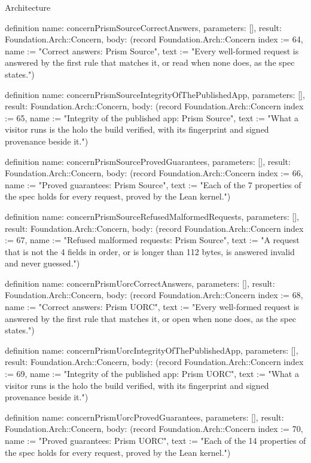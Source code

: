 \begin{lexlean}{Architecture}
\begin{semanticmodule}
definition{
  name: concernPrismSourceCorrectAnswers,
  parameters: [],
  result: Foundation.Arch::Concern,
  body: (record Foundation.Arch::Concern {index := 64, name := "Correct answers: Prism Source", text := "Every well-formed request is answered by the first rule that matches it, or read when none does, as the spec states."})
}

definition{
  name: concernPrismSourceIntegrityOfThePublishedApp,
  parameters: [],
  result: Foundation.Arch::Concern,
  body: (record Foundation.Arch::Concern {index := 65, name := "Integrity of the published app: Prism Source", text := "What a visitor runs is the holo the build verified, with its fingerprint and signed provenance beside it."})
}

definition{
  name: concernPrismSourceProvedGuarantees,
  parameters: [],
  result: Foundation.Arch::Concern,
  body: (record Foundation.Arch::Concern {index := 66, name := "Proved guarantees: Prism Source", text := "Each of the 7 properties of the spec holds for every request, proved by the Lean kernel."})
}

definition{
  name: concernPrismSourceRefusedMalformedRequests,
  parameters: [],
  result: Foundation.Arch::Concern,
  body: (record Foundation.Arch::Concern {index := 67, name := "Refused malformed requests: Prism Source", text := "A request that is not the 4 fields in order, or is longer than 112 bytes, is answered invalid and never guessed."})
}

definition{
  name: concernPrismUorcCorrectAnswers,
  parameters: [],
  result: Foundation.Arch::Concern,
  body: (record Foundation.Arch::Concern {index := 68, name := "Correct answers: Prism UORC", text := "Every well-formed request is answered by the first rule that matches it, or open when none does, as the spec states."})
}

definition{
  name: concernPrismUorcIntegrityOfThePublishedApp,
  parameters: [],
  result: Foundation.Arch::Concern,
  body: (record Foundation.Arch::Concern {index := 69, name := "Integrity of the published app: Prism UORC", text := "What a visitor runs is the holo the build verified, with its fingerprint and signed provenance beside it."})
}

definition{
  name: concernPrismUorcProvedGuarantees,
  parameters: [],
  result: Foundation.Arch::Concern,
  body: (record Foundation.Arch::Concern {index := 70, name := "Proved guarantees: Prism UORC", text := "Each of the 14 properties of the spec holds for every request, proved by the Lean kernel."})
}


\end{semanticmodule}
\end{lexlean}
